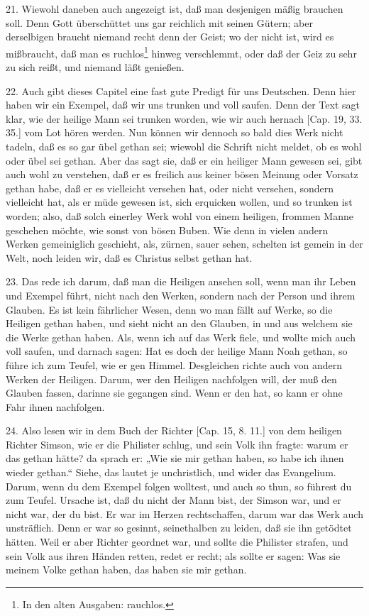 21. Wiewohl daneben auch angezeigt ist, daß man desjenigen mäßig brauchen soll. Denn Gott überschüttet uns gar reichlich mit seinen Gütern; aber derselbigen braucht niemand recht denn der Geist; wo der nicht ist, wird es mißbraucht, daß man es ruchlos\footnote{In den alten Ausgaben: rauchlos.} hinweg verschlemmt, oder daß der Geiz zu sehr zu sich reißt, und niemand läßt genießen.

22. Auch gibt dieses Capitel eine fast gute Predigt für uns Deutschen. Denn hier haben wir ein Exempel, daß wir uns trunken und voll saufen. Denn der Text sagt klar, wie der heilige Mann sei trunken worden, wie wir auch hernach [Cap. 19, 33. 35.] vom Lot hören werden. Nun können wir dennoch so bald dies Werk nicht tadeln, daß es so gar übel gethan sei; wiewohl die Schrift nicht meldet, ob es wohl oder übel sei gethan. Aber das sagt sie, daß er ein heiliger Mann gewesen sei, gibt auch wohl zu verstehen, daß er es freilich aus keiner bösen Meinung oder Vorsatz gethan habe, daß er es vielleicht versehen hat, oder nicht versehen, sondern vielleicht hat, als er müde gewesen ist, sich erquicken wollen, und so trunken ist worden; also, daß solch einerley Werk wohl von einem heiligen, frommen Manne geschehen möchte, wie sonst von bösen Buben. Wie denn in vielen andern Werken gemeiniglich geschieht, als, zürnen, sauer sehen, schelten ist gemein in der Welt, noch leiden wir, daß es Christus selbst gethan hat.

23. Das rede ich darum, daß man die Heiligen ansehen soll, wenn man ihr Leben und Exempel führt, nicht nach den Werken, sondern nach der Person und ihrem Glauben. Es ist kein fährlicher Wesen, denn wo man fällt auf Werke, so die Heiligen gethan haben, und sieht nicht an den Glauben, in und aus welchem sie die Werke gethan haben. Als, wenn ich auf das Werk fiele, und wollte mich auch voll saufen, und darnach sagen: Hat es doch der heilige Mann Noah gethan, so führe ich zum Teufel, wie er gen Himmel. Desgleichen richte auch von andern Werken der Heiligen. Darum, wer den Heiligen nachfolgen will, der muß den Glauben fassen, darinne sie gegangen sind. Wenn er den hat, so kann er ohne Fahr ihnen nachfolgen.

24. Also lesen wir in dem Buch der Richter [Cap. 15, 8. 11.] von dem heiligen Richter Simson, wie er die Philister schlug, und sein Volk ihn fragte: warum er das gethan hätte? da sprach er: „Wie sie mir gethan haben, so habe ich ihnen wieder gethan.“ Siehe, das lautet je unchristlich, und wider das Evangelium. Darum, wenn du dem Exempel folgen wolltest, und auch so thun, so führest du zum Teufel. Ursache ist, daß du nicht der Mann bist, der Simson war, und er nicht war, der du bist. Er war im Herzen rechtschaffen, darum war das Werk auch unsträflich. Denn er war so gesinnt, seinethalben zu leiden, daß sie ihn getödtet hätten. Weil er aber Richter geordnet war, und sollte die Philister strafen, und sein Volk aus ihren Händen retten, redet er recht; als sollte er sagen: Was sie meinem Volke gethan haben, das haben sie mir gethan.


